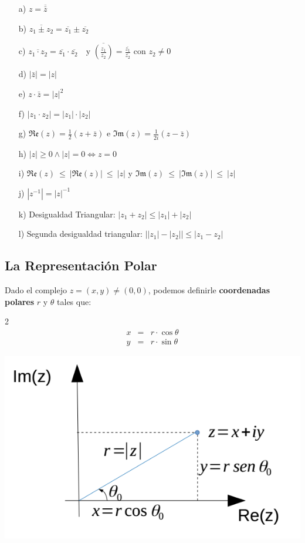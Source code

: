\documentclass[12pt]{article}
\theoremstyle{definition}
\begin{document}
	\begin{enumerate}
		\item[a)] $z = \overline{\bar{z}}$
		\item[b)] $\overline{z_1 \pm z_2} = \overline{z_1}\pm \overline{z_2}$
		\item[c)] $\overline{z_1 \cdot z_2} = \overline{z_1}\cdot \overline{z_2}$\ \ y $\displaystyle \overline{\left(\frac{z_1}{z_2}\right)} = \frac{\overline{z_1}}{\overline{z_2}}$ con $z_2 \neq 0$
		\item[d)] $|\bar{z}| = |z|$
		\item[e)] $z\cdot\bar{z} = |z|^2$
		\item[f)] $|z_1 \cdot z_2| = |z_1| \cdot |z_2|$
		\item[g)] $\mathfrak{Re}(z) = \frac{1}{2} (z + \bar{z})$ e $\mathfrak{Im}(z)=\frac{1}{2i}(z-\bar{z})$
		\item[h)] $|z| \geq 0 \land |z|=0 \Leftrightarrow z=0$
		\item[i)] $\mathfrak{Re}(z)\ \leq\ |\mathfrak{Re}(z)|\ \leq\ |z|$ y $\mathfrak{Im}(z)\ \leq\ |\mathfrak{Im}(z)|\ \leq\ |z|$
		\item[j)] $|z^{-1}| = |z|^{-1}$
		\item[k)] Desigualdad Triangular: $|z_1 + z_2| \leq  |z_1| + |z_2|$
		\item[l)] Segunda desigualdad triangular: $\left| |z_1| - |z_2| \right| \leq  |z_1 - z_2|$
	\end{enumerate}

\subsection{La Representaci\'on Polar}
Dado el complejo $z=(x, y) \neq (0,0)$, podemos definirle \textbf{coordenadas polares} $r$ y $\theta$ tales que:

\begin{multicols} {2}
\begin{eqnarray*}
x &=& r\cdot \cos \theta\\
y &=& r\cdot \sin \theta 
\end{eqnarray*}
\linebreak

\begin{center}
	\includegraphics[scale=0.5]{polar.png}
\end{center}
\end{multicols}
\end{document}
